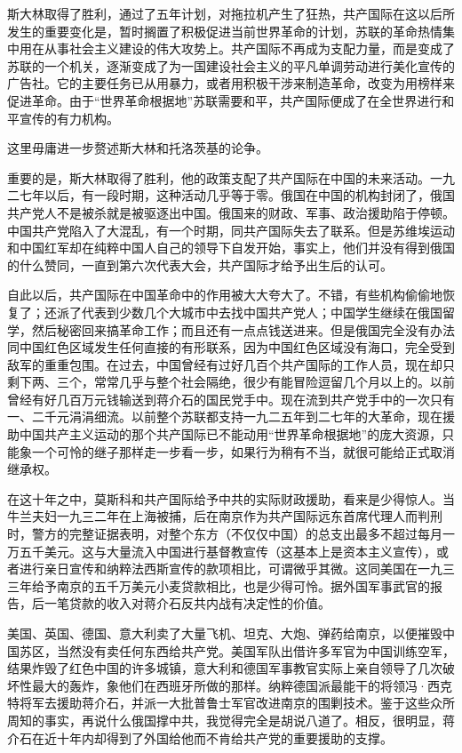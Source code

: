 \documentclass[10pt]{book}
\begin{document}
斯大林取得了胜利，通过了五年计划，对拖拉机产生了狂热，共产国际在这以后所发生的重要变化是，暂时搁置了积极促进当前世界革命的计划，苏联的革命热情集中用在从事社会主义建设的伟大攻势上。共产国际不再成为支配力量，而是变成了苏联的一个机关，逐渐变成了为一国建设社会主义的平凡单调劳动进行美化宣传的广告社。它的主要任务已从用暴力，或者用积极干涉来制造革命，改变为用榜样来促进革命。由于“世界革命根据地”苏联需要和平，共产国际便成了在全世界进行和平宣传的有力机构。

这里毋庸进一步赘述斯大林和托洛茨基的论争。

重要的是，斯大林取得了胜利，他的政策支配了共产国际在中国的未来活动。一九二七年以后，有一段时期，这种活动几乎等于零。俄国在中国的机构封闭了，俄国共产党人不是被杀就是被驱逐出中国。俄国来的财政、军事、政治援助陷于停顿。中国共产党陷入了大混乱，有一个时期，同共产国际失去了联系。但是苏维埃运动和中国红军却在纯粹中国人自己的领导下自发开始，事实上，他们并没有得到俄国的什么赞同，一直到第六次代表大会，共产国际才给予出生后的认可。

自此以后，共产国际在中国革命中的作用被大大夸大了。不错，有些机构偷偷地恢复了；还派了代表到少数几个大城市中去找中国共产党人；中国学生继续在俄国留学，然后秘密回来搞革命工作；而且还有一点点钱送进来。但是俄国完全没有办法同中国红色区域发生任何直接的有形联系，因为中国红色区域没有海口，完全受到敌军的重重包围。在过去，中国曾经有过好几百个共产国际的工作人员，现在却只剩下两、三个，常常几乎与整个社会隔绝，很少有能冒险逗留几个月以上的。以前曾经有好几百万元钱输送到蒋介石的国民党手中。现在流到共产党手中的一次只有一、二千元涓涓细流。以前整个苏联都支持一九二五年到二七年的大革命，现在援助中国共产主义运动的那个共产国际已不能动用“世界革命根据地”的庞大资源，只能象一个可怜的继子那样走一步看一步，如果行为稍有不当，就很可能给正式取消继承权。

在这十年之中，莫斯科和共产国际给予中共的实际财政援助，看来是少得惊人。当牛兰夫妇一九三二年在上海被捕，后在南京作为共产国际远东首席代理人而判刑时，警方的完整证据表明，对整个东方（不仅仅中国）的总支出最多不超过每月一万五千美元。这与大量流入中国进行基督教宣传（这基本上是资本主义宣传），或者进行亲日宣传和纳粹法西斯宣传的款项相比，可谓微乎其微。这同美国在一九三三年给予南京的五千万美元小麦贷款相比，也是少得可怜。据外国军事武官的报告，后一笔贷款的收入对蒋介石反共内战有决定性的价值。

美国、英国、德国、意大利卖了大量飞机、坦克、大炮、弹药给南京，以便摧毁中国苏区，当然没有卖任何东西给共产党。美国军队出借许多军官为中国训练空军，结果炸毁了红色中国的许多城镇，意大利和德国军事教官实际上亲自领导了几次破坏性最大的轰炸，象他们在西班牙所做的那样。纳粹德国派最能干的将领冯·西克特将军去援助蒋介石，并派一大批普鲁士军官改进南京的围剿技术。鉴于这些众所周知的事实，再说什么俄国撑中共，我觉得完全是胡说八道了。相反，很明显，蒋介石在近十年内却得到了外国给他而不肯给共产党的重要援助的支撑。
\end{document}
